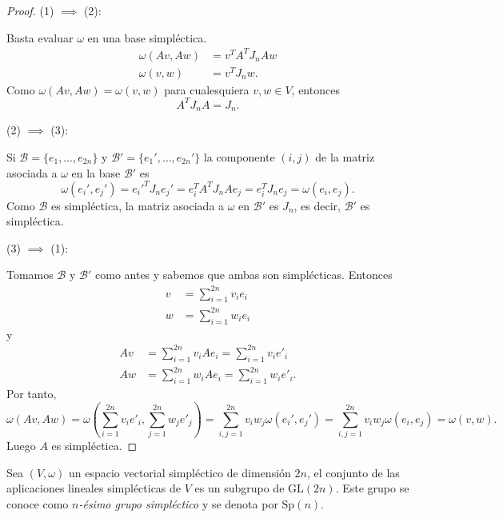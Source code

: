 \begin{proof}\leavevmode

  (1) $\implies$ (2):

  Basta evaluar $\omega$ en una base simpléctica. 
  \begin{align*}
    \omega(Av,Aw) & =v^TA^T J_n A w \\
    \omega(v,w) & =v^TJ_nw.
  \end{align*}
  Como $\omega(Av,Aw)=\omega(v,w)$ para cualesquiera $v,w \in V$, entonces
  \[
    A^T J_n A = J_n.
  \]

  (2) $\implies$ (3):

  Si $\mathcal{B}=\{e_1,\dots,e_{2n}\}$ y $\mathcal{B'}=\{e_1',\dots,e_{2n}'\}$ la componente $(i,j)$ de la matriz asociada a $\omega$ en la base $\mathcal{B'}$ es
  \[
    \omega(e_i',e_j')=e_i'^T J_n e_j'= e_i^T A^T J_n A e_j = e_i ^T J_n e_j = \omega(e_i,e_j).
  \]
  Como $\mathcal{B}$ es simpléctica, la matriz asociada a $\omega$ en $\mathcal{B'}$ es $J_n$, es decir, $\mathcal{B'}$ es simpléctica.

  (3) $\implies$ (1):

  Tomamos $\mathcal{B}$ y $\mathcal{B'}$ como antes y sabemos que ambas son simplécticas. Entonces
\begin{align*}
  v & =\sum_{i=1}^{2n} v_i e_i \\
  w & =\sum_{i=1}^{2n} w_i e_i
  \end{align*}
  y
\begin{align*}
  Av & =\sum_{i=1}^{2n} v_i Ae_i =\sum_{i=1}^{2n} v_i e'_i \\
  Aw & =\sum_{i=1}^{2n} w_i Ae_i = \sum_{i=1}^{2n} w_i e'_i.
  \end{align*}
  Por tanto, 
  \[
    \omega(Av,Aw)=\omega\left(\sum_{i=1}^{2n}v_i e'_i, \sum_{j=1}^{2n} w_j e'_j\right)= \sum_{i,j=1}^{2n} v_i w_j \omega(e_i',e_j')=\sum_{i,j=1}^{2n} v_i w_j \omega(e_i,e_j)= \omega(v,w).
  \]
  Luego $A$ es simpléctica.
\end{proof}
\begin{prop}
  Sea $(V,\omega)$ un espacio vectorial simpléctico de dimensión $2n$, el conjunto de las aplicaciones lineales simplécticas de $V$ es un subgrupo de $\mathrm{GL}(2n)$. Este grupo se conoce como \emph{$n$-ésimo grupo simpléctico} y se denota por $\mathrm{Sp}(n)$.
\end{prop}
